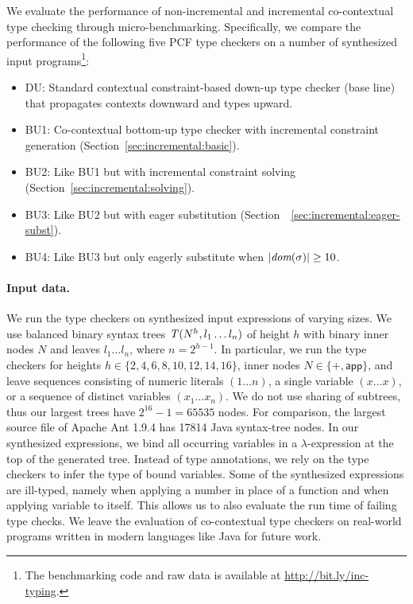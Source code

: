 \documentclass{llncs}
\begin{document}
We evaluate the performance of non-incremental and incremental co-contextual type
checking through micro-benchmarking. Specifically, we compare the performance of
the following five PCF type checkers on a number of synthesized input programs\footnote{The benchmarking code and raw data is available at \url{http://bit.ly/inc-typing}.}:

\begin{itemize}
\item DU: Standard contextual constraint-based down-up type checker (base line) that
  propagates contexts downward and types upward.
\item BU1: Co-contextual bottom-up type checker with incremental constraint generation (Section~\ref{sec:incremental:basic}).
\item BU2: Like BU1 but with incremental constraint solving (Section~\ref{sec:incremental:solving}).
\item BU3: Like BU2 but with eager substitution (Section~~\ref{sec:incremental:eager-subst}).
\item BU4: Like BU3 but only eagerly substitute when $|\textit{dom}(\sigma)| \ge 10$.
\end{itemize}



\paragraph{Input data.} We run the type checkers on synthesized input
expressions of varying sizes. We use balanced binary syntax trees
$\mathit{T}({N}^{h},l_1 \ldots l_n)$ of height $h$ with binary inner nodes $N$ and
leaves $l_1 \ldots l_n$, where $n = 2^{h-1}$. In particular, we run the type
checkers for heights $h \in \{2,4,6,8,10,12,14,16\}$, inner nodes $N \in \{+,
\textsf{app}\}$, and leave sequences consisting of numeric literals $(1 \ldots
n)$, a single variable $(x \ldots x)$, or a sequence of distinct variables $(x_1
\ldots x_n)$. We do not use sharing of subtrees, thus our largest trees have
$2^{16}-1 = 65535$ nodes. For comparison, the largest source file of
Apache Ant 1.9.4 has 17814 Java syntax-tree nodes. In our synthesized
expressions, we bind all occurring variables in a $\lambda$-expression at the
top of the generated tree. Instead of type annotations, we rely on the type
checkers to infer the type of bound variables. Some of the synthesized
expressions are ill-typed, namely when applying a number in place of a function
and when applying variable to itself. This allows us to also evaluate
the run time of failing type checks. We leave the evaluation of co-contextual
type checkers on real-world programs written in modern languages like Java for
future work.
\end{document}
